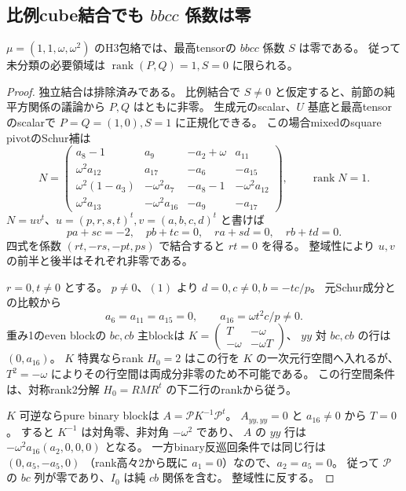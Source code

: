 \subsection{比例cube結合でも $bbcc$ 係数は零}
\label{subsec:cubic-third-root-unit-proportional-Snonzero}
\begin{theorem}
\label{thm:cubic-third-root-unit-Szero-necessary}
$\mu=(1,1,\omega,\omega^2)$ のH3包絡では、最高tensorの $bbcc$ 係数 $S$ は零である。
従って未分類の必要領域は
$\operatorname{rank}(P,Q)=1,S=0$ に限られる。
\end{theorem}
\begin{proof}
独立結合は排除済みである。
比例結合で $S\ne0$ と仮定すると、前節の純平方関係の議論から $P,Q$ はともに非零。
生成元のscalar、$U$ 基底と最高tensorのscalarで
$P=Q=(1,0),S=1$ に正規化できる。
この場合mixedのsquare pivotのSchur補は
\[
 N=\begin{pmatrix}
 a_8-1&a_9&-a_2+\omega&a_{11}\\
 \omega^2a_{12}&a_{17}&-a_6&-a_{15}\\
 \omega^2(1-a_3)&-\omega^2a_7&-a_8-1&-\omega^2a_{12}\\
 \omega^2a_{13}&-\omega^2a_{16}&-a_9&-a_{17}
 \end{pmatrix},\qquad\operatorname{rank}N=1.
\]
$N=uv^t$、$u=(p,r,s,t)^t,v=(a,b,c,d)^t$ と書けば
\[
 pa+sc=-2,\quad pb+tc=0,\quad ra+sd=0,\quad rb+td=0.
\tag{1}
\]
四式を係数 $(rt,-rs,-pt,ps)$ で結合すると $rt=0$ を得る。
整域性により $u,v$ の前半と後半はそれぞれ非零である。

$r=0,t\ne0$ とする。
$p\ne0$、$(1)$ より $d=0,c\ne0,b=-tc/p$。
元Schur成分との比較から
\[
 a_6=a_{11}=a_{15}=0,\qquad a_{16}=\omega t^2c/p\ne0.
\]
重み1のeven blockの $bc,cb$ 主blockは
$K=\left(\begin{smallmatrix}T&-\omega\\-\omega&-\omega T\end{smallmatrix}\right)$、
$yy$ 対 $bc,cb$ の行は $(0,a_{16})$。
$K$ 特異ならrank $H_0=2$ はこの行を $K$ の一次元行空間へ入れるが、
$T^2=-\omega$ によりその行空間は両成分非零のため不可能である。
この行空間条件は、対称rank2分解 $H_0=RMR^t$ の下二行のrankから従う。

$K$ 可逆ならpure binary blockは $A=\mathcal P K^{-1}\mathcal P^t$。
$A_{yy,yy}=0$ と $a_{16}\ne0$ から $T=0$。
すると $K^{-1}$ は対角零、非対角 $-\omega^2$ であり、
$A$ の $yy$ 行は $-\omega^2a_{16}(a_2,0,0,0)$ となる。
一方binary反巡回条件では同じ行は $(0,a_5,-a_5,0)$
（rank高々2から既に $a_1=0$）なので、$a_2=a_5=0$。
従って $\mathcal P$ の $bc$ 列が零であり、$I_0$ は純 $cb$ 関係を含む。
整域性に反する。


\end{proof}
